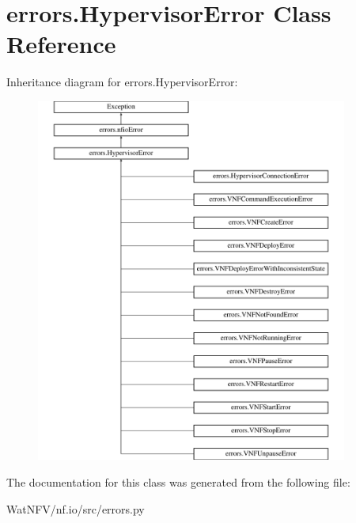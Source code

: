 \hypertarget{classerrors_1_1HypervisorError}{\section{errors.\-Hypervisor\-Error Class Reference}
\label{classerrors_1_1HypervisorError}
}
Inheritance diagram for errors.\-Hypervisor\-Error\-:\begin{figure}[H]
\begin{center}
\leavevmode
\includegraphics[height=12.000000cm]{classerrors_1_1HypervisorError}
\end{center}
\end{figure}


The documentation for this class was generated from the following file\-:\begin{DoxyCompactItemize}
\item 
Wat\-N\-F\-V/nf.\-io/src/errors.\-py\end{DoxyCompactItemize}
